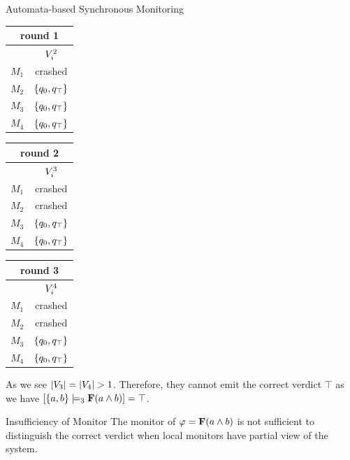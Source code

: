 \begin{frame}{Automata-based Synchronous Monitoring}

\begin{example}

\begin{center}
\begin{tabular}{| c |c|}
\multicolumn{2}{c}{round 1} \\
\hline
&$V_i^2$\\
\hline
$M_1$ & crashed\\
$M_2$ & $\{q_0, q_\top\}$\\
$M_3$ & $\{q_0, q_\top\}$ \\
$M_4$ & $\{q_0, q_\top\}$ \\
\hline
\end{tabular}
\quad
\begin{tabular}{| c |c|}
\multicolumn{2}{c}{round 2} \\
\hline
&$V_i^3$\\
\hline
$M_1$ & crashed\\
$M_2$ & crashed\\
$M_3$ & $\{q_0, q_\top\}$ \\
$M_4$ & $\{q_0, q_\top\}$ \\
\hline
\end{tabular}
\quad
\begin{tabular}{| c |c|}
\multicolumn{2}{c}{round 3} \\
\hline
&$V_i^4$\\
\hline
$M_1$ & crashed\\
$M_2$ & crashed\\
$M_3$ & $\{q_0, q_\top\}$ \\
$M_4$ & $\{q_0, q_\top\}$ \\
\hline
\end{tabular} 
\end{center}

As we see $|V_3|=|V_4| > 1$. Therefore, they cannot emit the correct verdict $\top$  as  we have $[\{a, b\} \models_3 \mathbf{F}(a \wedge b)] = \top$.
\end{example}

\begin{block}{Insufficiency of \LTLtri Monitor}
The \LTLtri monitor of $\varphi = \mathbf{F} (a \wedge b)$ is not sufficient to distinguish 
the correct verdict when local monitors have partial view of the system.



\end{block}
\end{frame}

